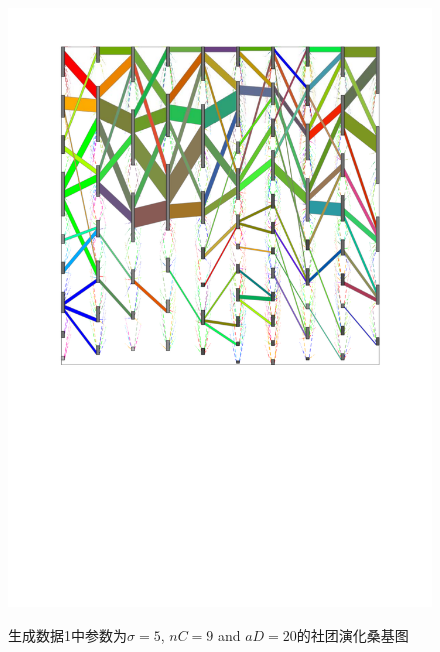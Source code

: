 \begin{figure}
{		\includegraphics[width=.3\textwidth,height=.125\textwidth]{figures/chap03/dsbm/facetNetEvolution/espra.pdf}
	}
	\caption{生成数据1中参数为$\sigma = 5$, $nC = 9$ and $aD = 20$的社团演化桑基图}
	\label{fig:SankeyFacetnet}
\end{figure}



